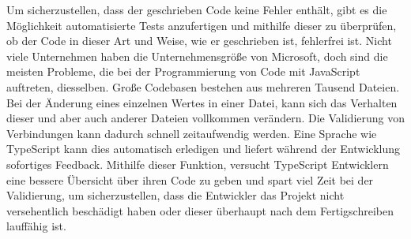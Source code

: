 Um sicherzustellen, dass der geschrieben Code keine Fehler enthält, gibt es die Möglichkeit automatisierte Tests anzufertigen und mithilfe dieser zu überprüfen, ob der Code in dieser Art und Weise, wie er geschrieben ist, fehlerfrei ist.
Nicht viele Unternehmen haben die Unternehmensgröße von Microsoft, doch sind die meisten Probleme, die bei der Programmierung von Code mit JavaScript auftreten, diesselben. Große Codebasen bestehen aus mehreren Tausend Dateien. Bei der Änderung eines einzelnen Wertes in einer Datei, kann sich das Verhalten dieser und aber auch anderer Dateien vollkommen verändern.
Die Validierung von Verbindungen kann dadurch schnell zeitaufwendig werden. Eine Sprache wie TypeScript kann dies automatisch erledigen und liefert während der Entwicklung sofortiges Feedback. Mithilfe dieser Funktion, versucht TypeScript Entwicklern eine bessere Übersicht über ihren Code zu geben und spart viel Zeit bei der Validierung, um sicherzustellen, dass die Entwickler das Projekt nicht versehentlich beschädigt haben oder dieser überhaupt nach dem Fertigschreiben lauffähig ist.

\cite{ScriptWiki}
